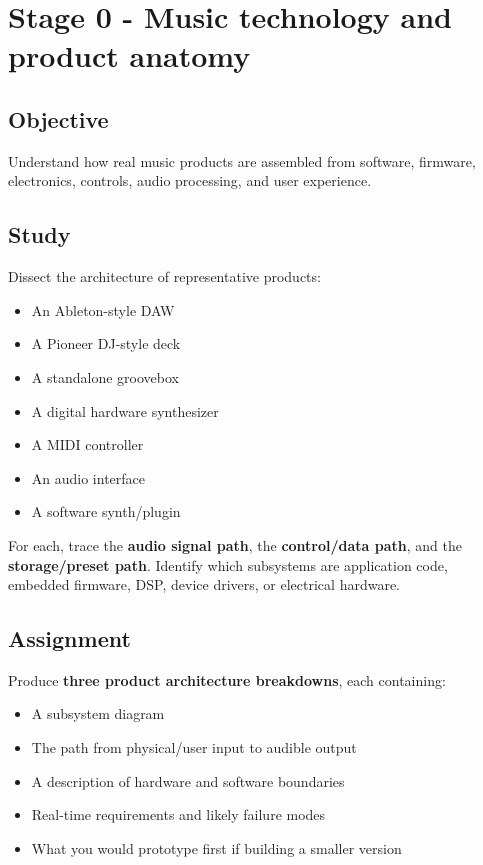 \documentclass[11pt,letterpaper]{article}
\begin{document}
\clearpage

\section{Stage 0 - Music technology and product anatomy}\label{stage-0-music-technology-and-product-anatomy}

\subsection*{Objective}\label{objective}

Understand how real music products are assembled from software, firmware, electronics, controls, audio processing, and user experience.

\subsection*{Study}\label{study}

Dissect the architecture of representative products:

\begin{itemize}
\item An Ableton-style DAW
\item A Pioneer DJ-style deck
\item A standalone groovebox
\item A digital hardware synthesizer
\item A MIDI controller
\item An audio interface
\item A software synth/plugin
\end{itemize}

For each, trace the \textbf{audio signal path}, the \textbf{control/data path}, and the \textbf{storage/preset path}. Identify which subsystems are application code, embedded firmware, DSP, device drivers, or electrical hardware.

\subsection*{Assignment}\label{assignment}

Produce \textbf{three product architecture breakdowns}, each containing:

\begin{itemize}
\item A subsystem diagram
\item The path from physical/user input to audible output
\item A description of hardware and software boundaries
\item Real-time requirements and likely failure modes
\item What you would prototype first if building a smaller version
\end{itemize}
\end{document}
